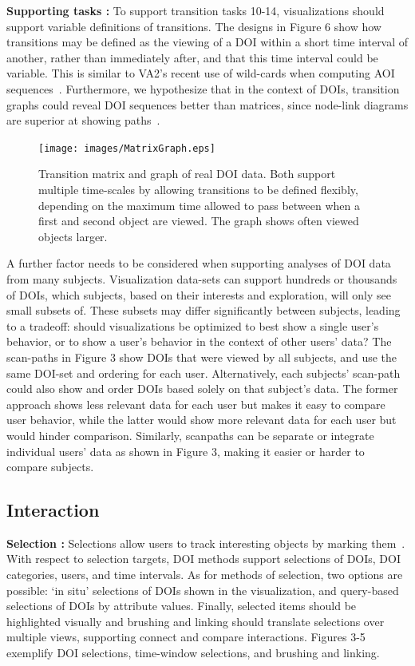 \noindent \textbf{Supporting tasks :} To support transition tasks 10-14, visualizations should support variable definitions of transitions. The designs in Figure 6 show how transitions may be defined as the viewing of a DOI within a short time interval of another, rather than immediately after, and that this time interval could be variable. This is similar to VA2's recent use of wild-cards when computing AOI sequences~\cite{blascheck2016va}. Furthermore, we hypothesize that in the context of DOIs, transition graphs could reveal DOI sequences better than matrices, since node-link diagrams are superior at showing paths~\cite{ghoniem2004comparison}.

\begin{figure}[htb]
  \centering
	\texttt{[image: images/MatrixGraph.eps]}
  \caption{Transition matrix and graph of real DOI data. Both support multiple time-scales by allowing transitions to be defined flexibly, depending on the maximum time allowed to pass between when a first and second object are viewed. The graph shows often viewed objects larger.}
	\label{fig:matrixGraph}
\end{figure}

A further factor needs to be considered when supporting analyses of DOI data from many subjects. Visualization data-sets can support hundreds or thousands of DOIs, which subjects, based on their interests and exploration, will only see small subsets of. These subsets may differ significantly between subjects, leading to a tradeoff: should visualizations be optimized to best show a single user's behavior, or to show a user's behavior in the context of other users' data? The scan-paths in Figure 3 show DOIs that were viewed by all subjects, and use the same DOI-set and ordering for each user. Alternatively, each subjects' scan-path could also show and order DOIs based solely on that subject's data. The former approach shows less relevant data for each user but makes it easy to compare user behavior, while the latter would show more relevant data for each user but would hinder comparison. Similarly, scanpaths can be separate or integrate individual users' data as shown in Figure 3, making it easier or harder to compare subjects.

\subsection{Interaction}
\noindent \textbf{Selection :} Selections allow users to track interesting objects by marking them~\cite{yi2007toward}. With respect to selection targets, DOI methods support selections of DOIs, DOI categories, users, and time intervals.  As for methods of selection, two options are possible: `in situ' selections of DOIs shown in the visualization, and query-based selections of DOIs by attribute values. Finally, selected items should be highlighted visually and brushing and linking should translate selections over multiple views, supporting connect and compare interactions. Figures 3-5 exemplify DOI selections, time-window selections, and brushing and linking.

